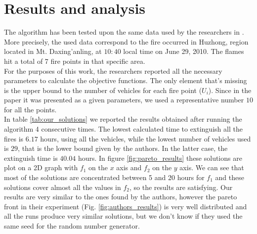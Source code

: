 \section{Results and analysis}
The algorithm has been tested upon the same data used by the researchers in \cite{fire_distinguish}. More precisely, the used data correspond to the fire occurred in Huzhong, region located in
Mt. Daxing’anling, at $10:40$ local time on June 29, 2010. The flames hit a total of 7 fire points in that specific area. \\
For the purposes of this work, the researchers reported all the necessary parameters to calculate the objective functions. The only element that's missing is the upper bound to the number
of vehicles for each fire point ($U_i$). Since in the paper it was presented as a given parameters, we used a representative number $10$ for all the points.\\
In table \ref{tab:our_solutions} we reported the results obtained after running the algorithm 4 consecutive times. The lowest calculated time to extinguish all
the fires is $6.17$ hours, using all the vehicles, while the lowest number of vehicles used is $29$, that is the lower bound given by the authors. In the latter case, the extinguish
time is $40.04$ hours. In figure \ref{fig:pareto_results} these solutions are plot on a 2D graph with $f_1$ on the $x$ axis and $f_2$ on the $y$ axis. 
We can see that most of the solutions are concentrated between 5 and 20 hours for $f_1$ and these solutions cover almost all the values in $f_2$, so the results are satisfying. 
Our results are very similar to the ones found by the authors, however the pareto front in their experiment (Fig. \ref{fig:authors_results}) is very well distributed and 
all the runs produce very similar solutions, but we don't know if they used the same seed for the random number generator.
\newpage
